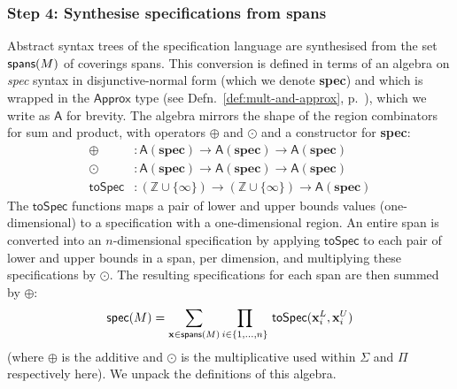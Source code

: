 \documentclass[9pt]{sigplanconf}
\theoremstyle{definition}
\newcommand{\term}[1]{\texttt{#1}}
\newcommand{\vect}[1]{\textbf{#1}}
\begin{document}
\subsubsection{Step 4: Synthesise specifications from spans}
\label{sec:inf-step4}

\newcommand{\bplus}{\operatornamewithlimits{\term{\Large{+}}}}
\newcommand{\tySum}[1]{#1^{\term{+}}}
\newcommand{\tyProd}[1]{#1^{\term{*}}}
\newcommand{\specDNF}{\textbf{spec}}

Abstract syntax trees of the specification language
are synthesised from the set $\textsf{spans}(M)$ of coverings spans. 
This conversion is defined in terms
of an algebra on \textit{spec} syntax in disjunctive-normal form
(which we denote \specDNF{}) and which is wrapped
in the $\textsf{Approx}$ type (see
Defn.~\ref{def:mult-and-approx},
p.~\pageref{def:mult-and-approx}), which we write as $\mathsf{A}$
for brevity.  The algebra mirrors the shape
of the region combinators for sum and product, 
with operators $\oplus$ and $\odot$ and a constructor for \specDNF{}:
\begin{align*}
\oplus & : \mathsf{A}(\specDNF) \rightarrow \mathsf{A}(\specDNF) \rightarrow
  \mathsf{A}(\specDNF) \\
\odot & : \mathsf{A}(\specDNF) \rightarrow \mathsf{A}(\specDNF) \rightarrow
        \mathsf{A}(\specDNF) \\
\mathsf{toSpec} & : (\mathbb{Z} \cup \{\infty\}) \rightarrow (\mathbb{Z} \cup
  \{\infty\})  \rightarrow \mathsf{A}(\specDNF)
\end{align*}
The $\mathsf{toSpec}$ functions maps a pair of lower and upper bounds
values (one-dimensional) to a specification with a one-dimensional region. 
An entire span is converted into an $n$-dimensional
specification by applying $\mathsf{toSpec}$ to each
pair of lower and upper bounds in a span, per dimension, and multiplying these
specifications by $\odot$. The resulting specifications for
each span are then summed by $\oplus$:
\begin{equation*}
\textsf{spec}(M) = 
\sum\limits_{\vect{x} \in \spanOp(M)}
\prod\limits_{i \in \{1, \ldots, n\}} \, \mathsf{toSpec}(\vect{x}^L_i, \vect{x}^U_i)
\end{equation*}
(where $\oplus$ is the additive and $\odot$ is the multiplicative used
within $\Sigma$ and $\Pi$ respectively here).
We unpack the definitions of this algebra.
\end{document}
